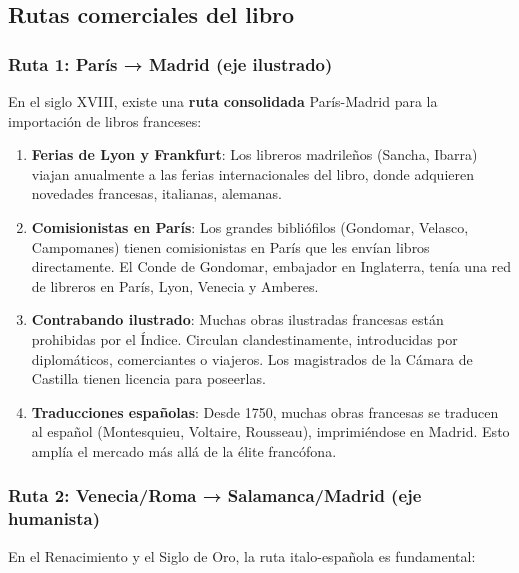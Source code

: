 \documentclass[11pt,a4paper]{article}
\begin{document}
\subsection{Rutas comerciales del libro}

\subsubsection{Ruta 1: París → Madrid (eje ilustrado)}

En el siglo XVIII, existe una \textbf{ruta consolidada} París-Madrid para la importación de libros franceses:

\begin{enumerate}
\item \textbf{Ferias de Lyon y Frankfurt}: Los libreros madrileños (Sancha, Ibarra) viajan anualmente a las ferias internacionales del libro, donde adquieren novedades francesas, italianas, alemanas.

\item \textbf{Comisionistas en París}: Los grandes bibliófilos (Gondomar, Velasco, Campomanes) tienen comisionistas en París que les envían libros directamente. El Conde de Gondomar, embajador en Inglaterra, tenía una red de libreros en París, Lyon, Venecia y Amberes.

\item \textbf{Contrabando ilustrado}: Muchas obras ilustradas francesas están prohibidas por el Índice. Circulan clandestinamente, introducidas por diplomáticos, comerciantes o viajeros. Los magistrados de la Cámara de Castilla tienen licencia para poseerlas.

\item \textbf{Traducciones españolas}: Desde 1750, muchas obras francesas se traducen al español (Montesquieu, Voltaire, Rousseau), imprimiéndose en Madrid. Esto amplía el mercado más allá de la élite francófona.
\end{enumerate}

\subsubsection{Ruta 2: Venecia/Roma → Salamanca/Madrid (eje humanista)}

En el Renacimiento y el Siglo de Oro, la ruta italo-española es fundamental:
\end{document}
